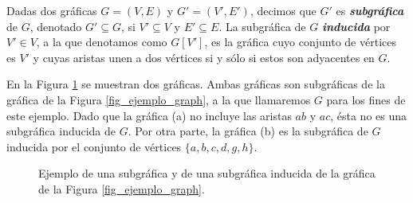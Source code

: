 Dadas dos gráficas $G=(V,E)$ y $G'=(V',E')$, decimos que $G'$ es \textbf{\emph{subgráfica}} de $G$, denotado $G' \subseteq G$, si $V' \subseteq V$ y $E' \subseteq E$. La subgráfica de $G$ \emph{\textbf{inducida}} por $V'\in V$, a la que denotamos como $G[V']$, es la gráfica cuyo conjunto de vértices es $V'$ y cuyas aristas unen a dos vértices si y sólo si estos son adyacentes en $G$.

En la Figura \ref{fig_ejemplo_subgraph} se muestran dos gráficas. Ambas gráficas son subgráficas de la gráfica de la Figura \ref{fig_ejemplo_graph}, a la que llamaremos $G$ para los fines de este ejemplo. Dado que la gráfica (a) no incluye las aristas $ab$ y $ac$, ésta no es una subgráfica inducida de $G$. Por otra parte, la gráfica (b) es la subgráfica de $G$ inducida por el conjunto de vértices $\{a,b,c,d,g,h\}$.


\begin{figure}[!htbp]
\centering
{}
\caption{Ejemplo de una subgráfica y de una subgráfica inducida de la gráfica de la Figura \ref{fig_ejemplo_graph}.}
\label{fig_ejemplo_subgraph}
\end{figure}

